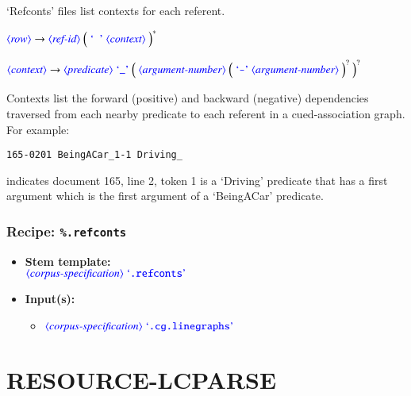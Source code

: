 \documentclass[12pt]{report}
\def\blue{\color{blue}}
\def\magenta{\color{magenta}}
\begin{document}
`Refconts' files list contexts for each referent.

$\dtype{row} \rightarrow \dtype{ref-id} \ \Big( \ \dcode{\ } \ \dtype{context} \ \Big)^*$

$\dtype{context} \rightarrow \dtype{predicate} \ \dcode{\_} \ \Big( \ \dtype{argument-number} \ \Big( \ \dcode{-} \ \dtype{argument-number} \ \Big)^? \ \Big)^?$

\noindent
Contexts list the forward (positive) and backward (negative) dependencies traversed from each nearby predicate to each referent in a cued-association graph.
%
For example:
%
{\magenta\begin{verbatim}
165-0201 BeingACar_1-1 Driving_
\end{verbatim}
}
%
indicates document 165, line 2, token 1 is a `Driving' predicate that has a first argument which is the first argument of a `BeingACar' predicate.

\subsection{Recipe: {\blue\tt \%.refconts}}

\begin{itemize}
      \item \textbf{Stem template:}\\
      $\dtype{corpus-specification} \ \dcode{.refconts}$
      \item \textbf{Input(s):}
      \begin{itemize}
            \item $\dtype{corpus-specification} \ \dcode{.cg.linegraphs}$
      \end{itemize}
\end{itemize}






\chapter{RESOURCE-LCPARSE}
\end{document}
